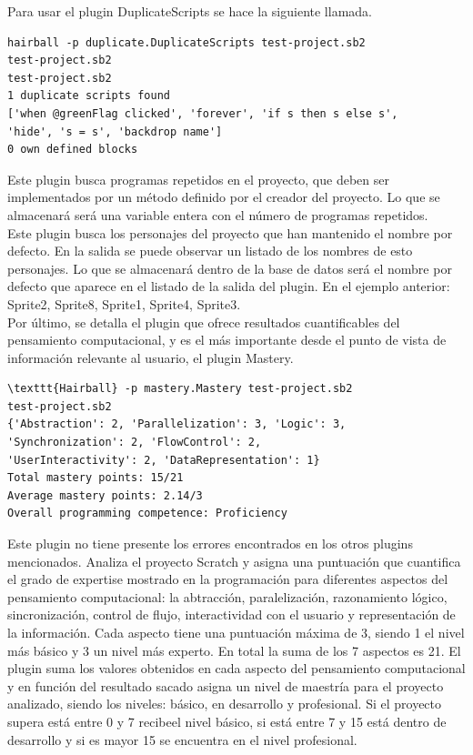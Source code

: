 \documentclass[a4paper, 12pt]{book}
\begin{document}
Para usar el plugin DuplicateScripts se hace la siguiente llamada.
\begingroup
\fontsize{8pt}{9pt}\selectfont
\begin{verbatim}
hairball -p duplicate.DuplicateScripts test-project.sb2 
test-project.sb2
test-project.sb2
1 duplicate scripts found
['when @greenFlag clicked', 'forever', 'if s then s else s',
'hide', 's = s', 'backdrop name']
0 own defined blocks
\end{verbatim}
\endgroup

Este plugin busca programas repetidos en el proyecto, que deben ser implementados por un
método definido por el creador del proyecto. Lo que se almacenará será una variable entera
con el número de programas repetidos. \\

Este plugin busca los personajes del proyecto que han mantenido el nombre por defecto. En
la salida se puede observar un listado de los nombres de esto personajes. Lo que se 
almacenará dentro de la base de datos será el nombre por defecto que aparece en el listado
de la salida del plugin. En el ejemplo anterior: Sprite2, Sprite8, Sprite1, Sprite4, Sprite3. \\


Por último, se detalla el plugin que ofrece resultados cuantificables del pensamiento 
computacional, y es el más importante desde el punto de vista de información relevante
al usuario, el plugin Mastery.

\begingroup
\fontsize{7pt}{8pt}\selectfont
\begin{verbatim}
\texttt{Hairball} -p mastery.Mastery test-project.sb2 
test-project.sb2
{'Abstraction': 2, 'Parallelization': 3, 'Logic': 3, 'Synchronization': 2, 'FlowControl': 2,
'UserInteractivity': 2, 'DataRepresentation': 1}
Total mastery points: 15/21
Average mastery points: 2.14/3
Overall programming competence: Proficiency
\end{verbatim}
\endgroup

Este plugin no tiene presente los errores encontrados en los otros plugins mencionados.
Analiza el proyecto Scratch y asigna una puntuación que cuantifica el grado de expertise
mostrado en la programación para diferentes aspectos del pensamiento computacional: la
abtracción, paralelización, razonamiento lógico, sincronización, control de flujo,
interactividad con el usuario y representación de la información. Cada aspecto tiene
una puntuación máxima de 3, siendo 1 el nivel más básico y 3 un nivel más experto. En
total la suma de los 7 aspectos es 21. El plugin suma los valores obtenidos en cada 
aspecto del pensamiento computacional y en función del resultado sacado asigna un
nivel de maestría para el proyecto analizado, siendo los niveles: básico, en desarrollo
y profesional. Si el proyecto supera está entre 0 y 7 recibeel nivel básico, si está 
entre 7 y 15 está dentro de desarrollo y si es mayor 15 se encuentra en el nivel
profesional. \\
\end{document}
